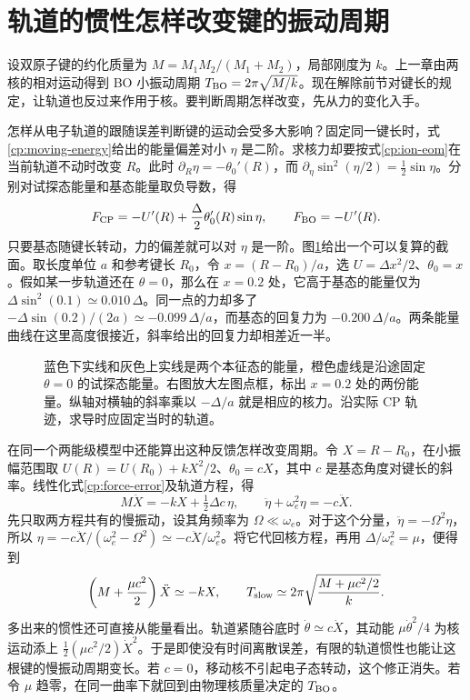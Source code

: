 \section{轨道的惯性怎样改变键的振动周期}
设双原子键的约化质量为 $M=M_1M_2/(M_1+M_2)$，局部刚度为 $k$。上一章由两核的相对运动得到 BO 小振动周期 $T_{\rm BO}=2\pi\sqrt{M/k}$。现在解除前节对键长的规定，让轨道也反过来作用于核。要判断周期怎样改变，先从力的变化入手。

怎样从电子轨道的跟随误差判断键的运动会受多大影响？固定同一键长时，式\eqref{cp:moving-energy}给出的能量偏差对小 $\eta$ 是二阶。求核力却要按式\eqref{cp:ion-eom}在当前轨道不动时改变 $R$。此时 $\partial_R\eta=-\theta_0'(R)$，而 $\partial_\eta\sin^2(\eta/2)=\tfrac12\sin\eta$。分别对试探态能量和基态能量取负导数，得
\begin{equation}\label{cp:force-error}
 F_{\rm CP}=-U'(R)+\frac{\Delta}{2}\theta_0'(R)\sin\eta,\qquad
 F_{\rm BO}=-U'(R).
\end{equation}
只要基态随键长转动，力的偏差就可以对 $\eta$ 是一阶。图\ref{cp:energy-curves}给出一个可以复算的截面。取长度单位 $a$ 和参考键长 $R_0$，令 $x=(R-R_0)/a$，选 $U=\Delta x^2/2$、$\theta_0=x$。假如某一步轨道还在 $\theta=0$，那么在 $x=0.2$ 处，它高于基态的能量仅为 $\Delta\sin^2(0.1)\simeq0.010\,\Delta$。同一点的力却多了 $-\Delta\sin(0.2)/(2a)\simeq-0.099\,\Delta/a$，而基态的回复力为 $-0.200\,\Delta/a$。两条能量曲线在这里高度很接近，斜率给出的回复力却相差近一半。

\begin{figure}[htbp]
\centering

\caption{蓝色下实线和灰色上实线是两个本征态的能量，橙色虚线是沿途固定 $\theta=0$ 的试探态能量。右图放大左图点框，标出 $x=0.2$ 处的两份能量。纵轴对横轴的斜率乘以 $-\Delta/a$ 就是相应的核力。沿实际 CP 轨迹，求导时应固定当时的轨道。}
\label{cp:energy-curves}
\end{figure}

在同一个两能级模型中还能算出这种反馈怎样改变周期。令 $X=R-R_0$，在小振幅范围取 $U(R)=U(R_0)+kX^2/2$、$\theta_0=cX$，其中 $c$ 是基态角度对键长的斜率。线性化式\eqref{cp:force-error}及轨道方程，得
\[
 M\ddot X=-kX+\tfrac12\Delta c\,\eta,\qquad
 \ddot\eta+\omega_e^2\eta=-c\ddot X .
\]
先只取两方程共有的慢振动，设其角频率为 $\Omega\ll\omega_e$。对于这个分量，$\ddot\eta=-\Omega^2\eta$，所以 $\eta=-c\ddot X/(\omega_e^2-\Omega^2)\simeq-c\ddot X/\omega_e^2$。将它代回核方程，再用 $\Delta/\omega_e^2=\mu$，便得到
\begin{equation}\label{cp:slow-period}
 \left(M+\frac{\mu c^2}{2}\right)\ddot X\simeq-kX,\qquad
 T_{\rm slow}\simeq2\pi\sqrt{\frac{M+\mu c^2/2}{k}} .
\end{equation}
多出来的惯性还可直接从能量看出。轨道紧随谷底时 $\dot\theta\simeq c\dot X$，其动能 $\mu\dot\theta^2/4$ 为核运动添上 $\tfrac12(\mu c^2/2)\dot X^2$。于是即使没有时间离散误差，有限的轨道惯性也能让这根键的慢振动周期变长。若 $c=0$，移动核不引起电子态转动，这个修正消失。若令 $\mu$ 趋零，在同一曲率下就回到由物理核质量决定的 $T_{\rm BO}$。
